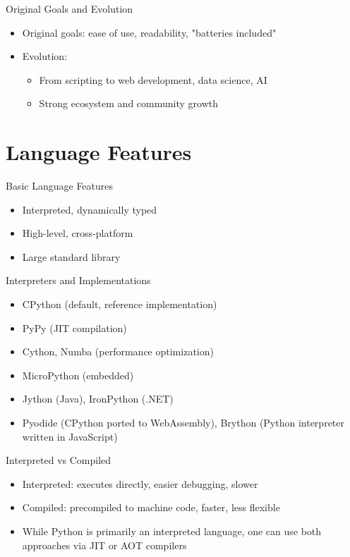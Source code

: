 \documentclass[12pt, aspectratio=169]{beamer}
\begin{document}
    \begin{frame}{Original Goals and Evolution}
        \begin{itemize}
            \item Original goals: ease of use, readability, "batteries included"
            \item Evolution:
            \begin{itemize}
                \item From scripting to web development, data science, AI
                \item Strong ecosystem and community growth
            \end{itemize}
        \end{itemize}
    \end{frame}


    \section{Language Features}

        \begin{frame}{Basic Language Features}
        \begin{itemize}
            \item Interpreted, dynamically typed
            \item High-level, cross-platform
            \item Large standard library
        \end{itemize}
    \end{frame}


    \begin{frame}{Interpreters and Implementations}
        \begin{itemize}
            \item CPython (default, reference implementation)
            \item PyPy (JIT compilation)
            \item Cython, Numba (performance optimization)
            \item MicroPython (embedded)
            \item Jython (Java), IronPython (.NET)
            \item Pyodide (CPython ported to WebAssembly), Brython (Python interpreter written in JavaScript)
        \end{itemize}
    \end{frame}


    \begin{frame}{Interpreted vs Compiled}
        \begin{itemize}
            \item Interpreted: executes directly, easier debugging, slower
            \item Compiled: precompiled to machine code, faster, less flexible
            \item While Python is primarily an interpreted language, one can use both approaches via JIT or AOT compilers
        \end{itemize}
    \end{frame}
\end{document}
